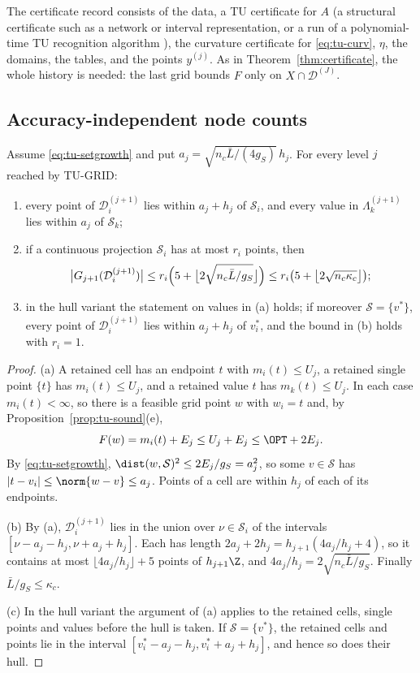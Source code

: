 The certificate record consists of the data, a TU certificate for $A$
(a structural certificate such as a network or interval representation, or a
run of a polynomial-time TU recognition algorithm \cite[Chapter~20]{Schrijver1986}),
the curvature certificate for \eqref{eq:tu-curv}, $\eta$, the domains, the
tables, and the points $y^{(j)}$. As in Theorem~\ref{thm:certificate}, the
whole history is needed: the last grid bounds $F$ only on
$X\cap\mathcal D^{(J)}$.

\subsection{Accuracy-independent node counts}\label{sec:tu-states}

\begin{theorem}\label{thm:tu-states}
Assume \eqref{eq:tu-setgrowth} and put $a_j=\sqrt{n_c\bar L/(4g_S)}\,h_j$. For
every level $j$ reached by TU-GRID:
\begin{enumerate}[label=(\alph*)]
\item every point of $\mathcal D^{(j+1)}_i$ lies within $a_j+h_j$ of
$\mathcal S_i$, and every value in $\Lambda^{(j+1)}_k$ lies within $a_j$ of
$\mathcal S_k$;
\item if a continuous projection $\mathcal S_i$ has at most $r_i$ points, then
\[
\bigl\lvert G_{j+1}(\mathcal D^{(j+1)}_i)\bigr\rvert\le
r_i\Bigl(5+\bigl\lfloor2\sqrt{n_c\bar L/g_S}\bigr\rfloor\Bigr)
\le r_i\bigl(5+\bigl\lfloor2\sqrt{n_c\kappa_c}\bigr\rfloor\bigr);
\]
\item in the hull variant the statement on values in (a) holds; if moreover
$\mathcal S=\{v^*\}$, every point of $\mathcal D^{(j+1)}_i$ lies within
$a_j+h_j$ of $v^*_i$, and the bound in (b) holds with $r_i=1$.
\end{enumerate}
\end{theorem}

\begin{proof}
(a) A retained cell has an endpoint $t$ with $m_i(t)\le U_j$, a retained
single point $\{t\}$ has $m_i(t)\le U_j$, and a retained value $t$ has
$m_k(t)\le U_j$. In each case $m_i(t)<\infty$, so there is a feasible grid
point $w$ with $w_i=t$ and, by Proposition~\ref{prop:tu-sound}(e),
\[
F(w)=m_i(t)+E_j\le U_j+E_j\le\OPT+2E_j .
\]
By \eqref{eq:tu-setgrowth}, $\dist(w,\mathcal S)^2\le2E_j/g_S=a_j^2$, so some
$v\in\mathcal S$ has $\lvert t-v_i\rvert\le\norm{w-v}\le a_j$. Points of a cell
are within $h_j$ of each of its endpoints.

(b) By (a), $\mathcal D^{(j+1)}_i$ lies in the union over $\nu\in\mathcal S_i$
of the intervals $[\nu-a_j-h_j,\nu+a_j+h_j]$. Each has length
$2a_j+2h_j=h_{j+1}(4a_j/h_j+4)$, so it contains at most
$\lfloor4a_j/h_j\rfloor+5$ points of $h_{j+1}\Z$, and
$4a_j/h_j=2\sqrt{n_c\bar L/g_S}$. Finally $\bar L/g_S\le\kappa_c$.

(c) In the hull variant the argument of (a) applies to the retained cells,
single points and values before the hull is taken. If $\mathcal S=\{v^*\}$,
the retained cells and points lie in the interval
$[v^*_i-a_j-h_j,v^*_i+a_j+h_j]$, and hence so does their hull.
\end{proof}

